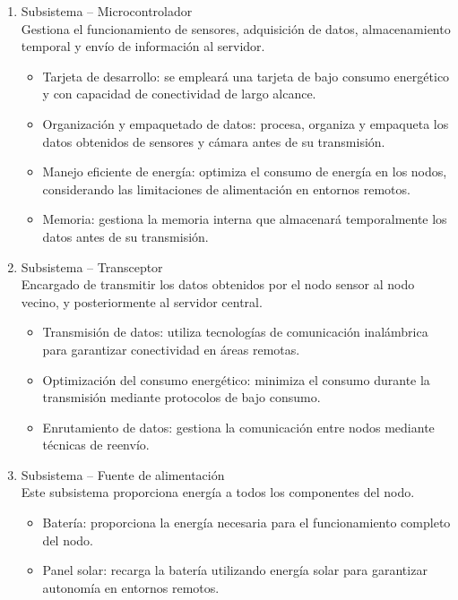 \begin{enumerate}
    \item Subsistema – Microcontrolador \\
    Gestiona el funcionamiento de sensores, adquisición de datos, almacenamiento temporal y envío de información al servidor.
    \begin{itemize}
        \item Tarjeta de desarrollo: se empleará una tarjeta de bajo consumo energético y con capacidad de conectividad de largo alcance.
        \item Organización y empaquetado de datos: procesa, organiza y empaqueta los datos obtenidos de sensores y cámara antes de su transmisión.
        \item Manejo eficiente de energía: optimiza el consumo de energía en los nodos, considerando las limitaciones de alimentación en entornos remotos.
        \item Memoria: gestiona la memoria interna que almacenará temporalmente los datos antes de su transmisión.
    \end{itemize}

    \item Subsistema – Transceptor \\
    Encargado de transmitir los datos obtenidos por el nodo sensor al nodo vecino, y posteriormente al servidor central.
    \begin{itemize}
        \item Transmisión de datos: utiliza tecnologías de comunicación inalámbrica para garantizar conectividad en áreas remotas.
        \item Optimización del consumo energético: minimiza el consumo durante la transmisión mediante protocolos de bajo consumo.
        \item Enrutamiento de datos: gestiona la comunicación entre nodos mediante técnicas de reenvío.
    \end{itemize}

    \item Subsistema – Fuente de alimentación \\
    Este subsistema proporciona energía a todos los componentes del nodo.
    \begin{itemize}
        \item Batería: proporciona la energía necesaria para el funcionamiento completo del nodo.
        \item Panel solar: recarga la batería utilizando energía solar para garantizar autonomía en entornos remotos.
    \end{itemize}
\end{enumerate}

